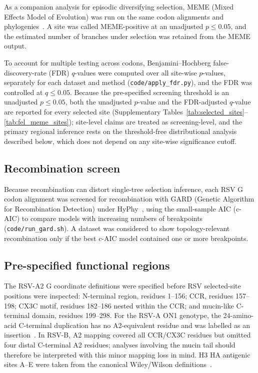 \documentclass[11pt]{article}
\begin{document}
As a companion analysis for episodic diversifying selection, MEME (Mixed Effects Model of Evolution) was run on the same codon alignments and phylogenies~\cite{murrell2012meme}. A site was called MEME-positive at an unadjusted $p\leq0.05$, and the estimated number of branches under selection was retained from the MEME output.

To account for multiple testing across codons, Benjamini--Hochberg false-discovery-rate (FDR) $q$-values were computed over all site-wise $p$-values, separately for each dataset and method (\texttt{code/apply\_fdr.py}), and the FDR was controlled at $q\leq0.05$. Because the pre-specified screening threshold is an unadjusted $p\leq0.05$, both the unadjusted $p$-value and the FDR-adjusted $q$-value are reported for every selected site (Supplementary Tables~\ref{tab:selected_sites}--\ref{tab:fel_meme_sites}); site-level claims are treated as screening-level, and the primary regional inference rests on the threshold-free distributional analysis described below, which does not depend on any site-wise significance cutoff.

\subsection{Recombination screen}

Because recombination can distort single-tree selection inference, each RSV G codon alignment was screened for recombination with GARD (Genetic Algorithm for Recombination Detection) under HyPhy~\cite{kosakovsky2006gard}, using the small-sample AIC (c-AIC) to compare models with increasing numbers of breakpoints (\texttt{code/run\_gard.sh}). A dataset was considered to show topology-relevant recombination only if the best c-AIC model contained one or more breakpoints.

\subsection{Pre-specified functional regions}

The RSV-A2 G coordinate definitions were specified before RSV selected-site positions were inspected: N-terminal region, residues 1--156; CCR, residues 157--198; CX3C motif, residues 182--186 nested within the CCR; and mucin-like C-terminal domain, residues 199--298. For the RSV-A ON1 genotype, the 24-amino-acid C-terminal duplication has no A2-equivalent residue and was labelled as an insertion~\cite{eshaghi2012}. In RSV-B, A2 mapping covered all CCR/CX3C residues but omitted four distal C-terminal A2 residues; analyses involving the mucin tail should therefore be interpreted with this minor mapping loss in mind. H3 HA antigenic sites A--E were taken from the canonical Wiley/Wilson definitions~\cite{wiley1981}.
\end{document}
